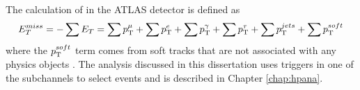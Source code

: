 		The calculation of \Etm in the \gls{ATLAS} detector is defined as
		\begin{equation}\label{eqn:etmiss}
		E_{T}^{miss} = - \sum E_{T} = \sum p_{\text{T}}^{\mu} + \sum p_{\text{T}}^{e} + \sum p_{\text{T}}^{\gamma} + \sum p_{\text{T}}^{\tau} + \sum p_{\text{T}}^{jets} + \sum p_{\text{T}}^{soft}
		\end{equation}
		where the $p_{\text{T}}^{soft}$ term comes from soft tracks that are not associated with any physics objects \cite{met-perf}. The analysis discussed in this dissertation uses \Etm triggers in one of the subchannels to select events and is described in Chapter \ref{chap:hpana}.
